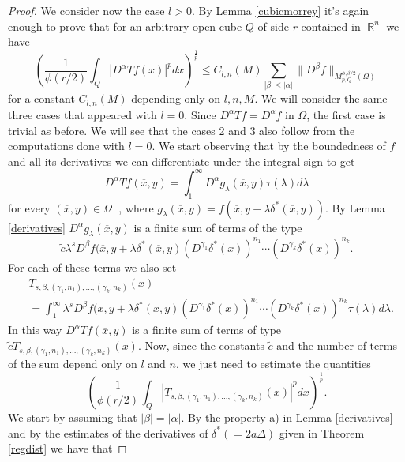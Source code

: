 \documentclass[12pt]{article}
\theoremstyle{definition}
\DeclareMathOperator\rr{\mathbb{R}}
\begin{document}
\begin{proof}
We consider now the case $l>0.$ By Lemma \ref{cubicmorrey} it's again enough to prove that for an arbitrary open cube $Q$ of side $r$ contained in $\rr^n$ we have
\begin{equation}
\left(\frac{1}{\phi(r/2)}\int_Q |D^\alpha Tf(x)|^pdx \right)^{\frac{1}{p}} \le C_{l,n}(M) \sum_{|\beta| \le |\alpha|}\| D^\beta f\|_{M_{p,Q}^{\phi,\delta/2}(\Omega)}
\end{equation}
for a constant $C_{l,n}(M)$ depending only on $l,n,M$. We will consider the same three cases that appeared with $l=0$. Since $D^\alpha Tf=D^\alpha f$ in $\Omega$, the first case is trivial as before. We will see that the cases 2 and 3 also follow from the computations done with $l=0$. We start observing that by the boundedness of $f$ and all its derivatives we can differentiate under the integral sign to get
\[D^\alpha Tf(\overline x,y)= \int_1^\infty D^\alpha g_\lambda(\overline x,y) \tau(\lambda) d\lambda\]
for every $(\overline x, y) \in \Omega^-$, where $g_\lambda(\overline x,y)=f(\overline x, y+\lambda \delta^*(\overline x, y))$. By Lemma \ref{derivatives} $D^\alpha g_\lambda(\overline x,y)$ is a finite sum of terms of the type 
\[ \widetilde c\lambda ^s D^\beta f(\overline x, y+\lambda \delta^*(\overline x, y)(D^{\gamma_1}\delta^*(x))^{n_1}\cdots (D^{\gamma_k}\delta^*(x))^{n_k}.\]
For each of these terms we also set
\begin{align*}
 &T_{s,\beta,(\gamma_1,n_1),...,(\gamma_k,n_k)}(x) \\
 &= \int_1^\infty \lambda ^s D^\beta f(\overline x, y+\lambda \delta^*(\overline x, y)(D^{\gamma_1}\delta^*(x))^{n_1}\cdots (D^{\gamma_k}\delta^*(x))^{n_k} \tau(\lambda) d\lambda.
 \end{align*}
In this way $D^\alpha Tf(\overline x,y)$ is a finite sum of terms of type $\widetilde c T_{s,\beta,(\gamma_1,n_1),...,(\gamma_k,n_k)}(x)$. Now, since the constants $\widetilde c$ and the number of terms of the sum depend only on $l$ and $n$, we just need to estimate the quantities
\[\left( \frac{1}{\phi(r/2)}\int_Q  \left| T_{s,\beta,(\gamma_1,n_1),...,(\gamma_k,n_k)}(x)\right|^p dx\right )^{\frac{1}{p}}.\]
We start by assuming that $|\beta|=|\alpha|.$ By the property a) in Lemma \ref{derivatives} and by the estimates of the derivatives of $\delta^*(=2a\Delta)$ given in Theorem \ref{regdist} we have that


\end{proof}
\end{document}
